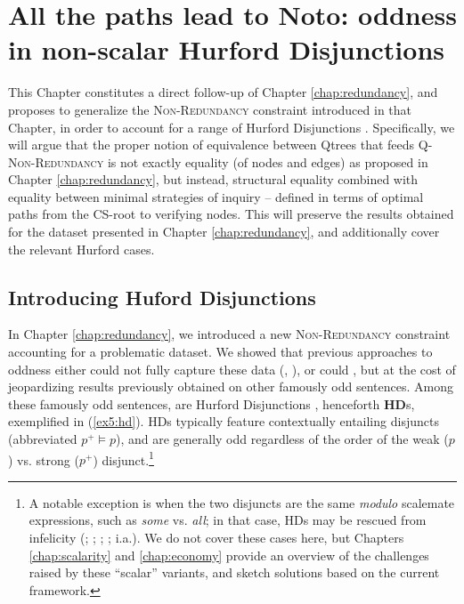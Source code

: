 \chapter[All the paths lead to Noto: oddness in non-scalar Hurford Disjunctions]{All the paths lead to Noto: oddness in non-scalar Hurford Disjunctions\footnotemark}\label{chap:hurford-disj}

This Chapter constitutes a direct follow-up of Chapter \ref{chap:redundancy}, and proposes to generalize the \textsc{Non-Redundancy} constraint introduced in that Chapter, in order to account for a range of Hurford Disjunctions \citep{Hurford1974,Marty2022}. Specifically, we will argue that the proper notion of equivalence between Qtrees that feeds \textsc{Q-Non-Redundancy} is not exactly equality (of nodes and edges) as proposed in Chapter \ref{chap:redundancy}, but instead, structural equality combined with equality between minimal strategies of inquiry -- defined in terms of optimal paths from the CS-root to verifying nodes. This will preserve the results obtained for the dataset presented in Chapter \ref{chap:redundancy}, and additionally cover the relevant Hurford cases.

\section{Introducing Huford Disjunctions}
In Chapter \ref{chap:redundancy}, we introduced a new \textsc{Non-Redundancy} constraint accounting for a problematic dataset. We showed that previous approaches to oddness either could not fully capture these data (, ), or could \citep{Mayr2016}, but at the cost of jeopardizing results previously obtained on other famously odd sentences. Among these famously odd sentences, are Hurford Disjunctions \citep{Hurford1974}, henceforth \textbf{HD}s, exemplified in (\ref{ex5:hd}). HDs typically feature contextually entailing disjuncts (abbreviated $p^+ \vDash p$), and are generally odd regardless of the order of the weak ($p$) vs. strong ($p^+$) disjunct.\footnote{A notable exception is when the two disjuncts are the same \textit{modulo} scalemate expressions, such as \textit{some} vs. \textit{all}; in that case, HDs may be rescued from infelicity (; ; ; ;  i.a.). We do not cover these cases here, but Chapters \ref{chap:scalarity} and \ref{chap:economy} provide an overview of the challenges raised by these ``scalar'' variants, and sketch solutions based on the current framework.}

